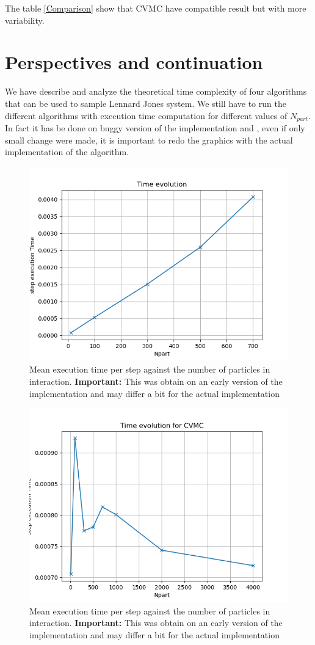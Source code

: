 \documentclass[jcp,twocolumn,longbibliography,superscriptaddress]{revtex4-2}
\newcommand{\Npart}{N_{part}}
\begin{document}
	The table \ref{Comparison} show that CVMC have compatible result but with more variability.
	
	\section{Perspectives and continuation}
	We have describe and analyze the theoretical time complexity of four algorithms that can be used to sample Lennard Jones system. We still have to run the different algorithms with execution time computation for different values of $\Npart$. In fact it has be done on buggy version of the implementation  and  , even if only small change were made, it is important to redo the graphics with the actual implementation of the algorithm.
	\begin{figure}[htb]
		\centering
		\includegraphics[width=0.8\columnwidth]{./Figures/timeEvolutionMetropolis.png}
		\caption{Mean execution time per step against the number of particles in interaction. \textbf{Important:} This was obtain on an early version of the implementation and may differ a bit for the actual implementation}
		\label{time Metropolis}
	\end{figure}
	
	\begin{figure}[htb]
		\centering
		\includegraphics[width=0.8\columnwidth]{./Figures/timeEvolutionCVMC.png}
		\caption{Mean execution time per step against the number of particles in interaction. \textbf{Important:} This was obtain on an early version of the implementation and may differ a bit for the actual implementation}
		\label{time CVMC}
	\end{figure}
	
\end{document}
